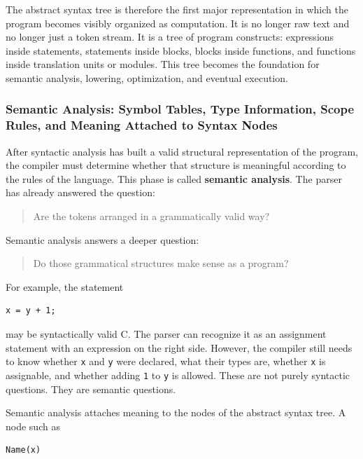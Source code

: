 The abstract syntax tree is therefore the first major representation in which the program becomes visibly organized as computation. It is no longer raw text and no longer just a token stream. It is a tree of program constructs: expressions inside statements, statements inside blocks, blocks inside functions, and functions inside translation units or modules. This tree becomes the foundation for semantic analysis, lowering, optimization, and eventual execution.


\subsubsection{Semantic Analysis: Symbol Tables, Type Information, Scope Rules, and Meaning Attached to Syntax Nodes}

After syntactic analysis has built a valid structural representation of the program, the compiler must determine whether that structure is meaningful according to the rules of the language. This phase is called \textbf{semantic analysis}. The parser has already answered the question:

\begin{quote}
Are the tokens arranged in a grammatically valid way?
\end{quote}

Semantic analysis answers a deeper question:

\begin{quote}
Do those grammatical structures make sense as a program?
\end{quote}

For example, the statement

\begin{verbatim}
x = y + 1;
\end{verbatim}

may be syntactically valid C. The parser can recognize it as an assignment statement with an expression on the right side. However, the compiler still needs to know whether \texttt{x} and \texttt{y} were declared, what their types are, whether \texttt{x} is assignable, and whether adding \texttt{1} to \texttt{y} is allowed. These are not purely syntactic questions. They are semantic questions.

Semantic analysis attaches meaning to the nodes of the abstract syntax tree. A node such as

\begin{verbatim}
Name(x)
\end{verbatim}

